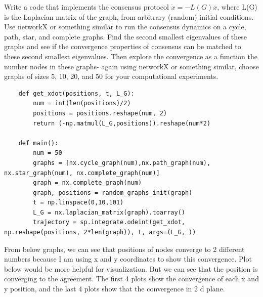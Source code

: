 \documentclass{article}
\begin{document}
\begin{problem}
    Write a code that implements the consensus protocol  $\dot{x}=-L(G) x$, where L(G) is the Laplacian matrix of the graph,  from arbitrary (random) initial conditions. Use networkX or something similar to run the consensus dynamics on a cycle, path, star, and complete graphs. Find the second smallest eigenvalues of these graphs and see if the convergence properties of consensus  can be matched to these second smallest eigenvalues. Then explore the convergence as a function the number  nodes in these graphs- again using networkX or something similar, choose graphs of sizes 5, 10, 20, and 50 for your computational experiments.
    \begin{verbatim}
    def get_xdot(positions, t, L_G):
        num = int(len(positions)/2)
        positions = positions.reshape(num, 2)
        return (-np.matmul(L_G,positions)).reshape(num*2)
        
    def main():
        num = 50
        graphs = [nx.cycle_graph(num),nx.path_graph(num), nx.star_graph(num), nx.complete_graph(num)]
        graph = nx.complete_graph(num)
        graph, positions = random_graphs_init(graph)
        t = np.linspace(0,10,101)
        L_G = nx.laplacian_matrix(graph).toarray()
        trajectory = sp.integrate.odeint(get_xdot, np.reshape(positions, 2*len(graph)), t, args=(L_G, ))
    \end{verbatim}
    From below graphs, we can see that positions of nodes converge to 2 different numbers because I am using x and y coordinates to show this convergence. Plot below would be more helpful for visualization. But we can see that the position is converging to the agreement. The first 4 plots show the convergence of each x and y position, and the last 4 plots show that the convergence in 2 d plane. 
    

\end{problem}
\end{document}
